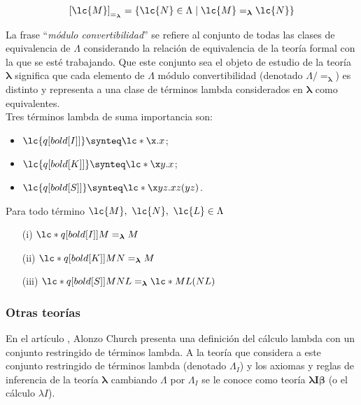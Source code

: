 \[\left[ \lc{M} \right]_{=_{\boldsymbol{\lambda}}} = \left\{ \lc{N} \in \Lambda
    \mid \lc{M}=_{\boldsymbol{\lambda}}\lc{N} \right\}\]

La frase ``\emph{módulo convertibilidad}'' se refiere al conjunto de todas las
clases de equivalencia de \(\Lambda\) considerando la relación de equivalencia
de la teoría formal con la que se esté trabajando. Que este conjunto sea el
objeto de estudio de la teoría \(\boldsymbol{\lambda}\) significa que cada
elemento de \(\Lambda\) módulo convertibilidad (denotado \(\Lambda /
=_{\boldsymbol{\lambda}}\)) es distinto y representa a una clase de
términos lambda considerados en \(\boldsymbol{\lambda}\) como equivalentes. \\

Tres términos lambda de suma importancia son:

\begin{itemize}
\item \(\lc{q[bold[I]]} \synteq \lc*{\x.x}\);
\item \(\lc{q[bold[K]]} \synteq \lc*{\x y.x}\);
\item \(\lc{q[bold[S]]} \synteq \lc*{\x y z.x z(y z)}\).
\end{itemize}

\begin{cor}
  Para todo término \(\lc{M},\ \lc{N},\ \lc{L} \in \Lambda\)
  \begin{itemize}
  \item[(i)] \(\lc*{q[bold[I]] M} =_{\boldsymbol{\lambda}} M\)
  \item[(ii)] \(\lc*{q[bold[K]] M N} =_{\boldsymbol{\lambda}} M\)
  \item[(iii)] \(\lc*{q[bold[S]] M N L} =_{\boldsymbol{\lambda}} \lc*{M L(N L)}\)
  \end{itemize}
\end{cor}

\subsubsection{Otras teorías}

En el artículo \cite{Church:LambdaConversion}, Alonzo Church presenta una
definición del cálculo lambda con un conjunto restringido de términos lambda. A
la teoría que considera a este conjunto restringido de términos lambda (denotado
\(\Lambda_{I}\)) y los axiomas  y reglas de inferencia de la teoría
\(\boldsymbol{\lambda}\) cambiando \(\Lambda\) por \(\Lambda_{I}\) se le conoce
como teoría \(\boldsymbol{\lambda I \beta}\) (o el cálculo \(\lambda I\)). \\

